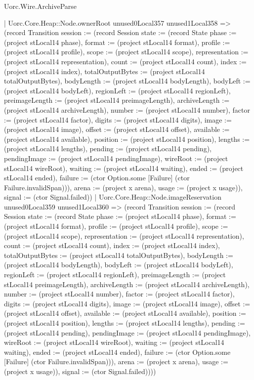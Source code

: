 \begin{lexlean}{Uorc.Wire.ArchiveParse}
\begin{semanticmodule}
{            | Uorc.Core.Heap::Node.ownerRoot unused0Local357 unused1Local358 => (record Transition {session := (record Session {state := (record State {phase := (project stLocal14 phase), format := (project stLocal14 format), profile := (project stLocal14 profile), scope := (project stLocal14 scope), representation := (project stLocal14 representation), count := (project stLocal14 count), index := (project stLocal14 index), totalOutputBytes := (project stLocal14 totalOutputBytes), bodyLength := (project stLocal14 bodyLength), bodyLeft := (project stLocal14 bodyLeft), regionLeft := (project stLocal14 regionLeft), preimageLength := (project stLocal14 preimageLength), archiveLength := (project stLocal14 archiveLength), number := (project stLocal14 number), factor := (project stLocal14 factor), digits := (project stLocal14 digits), image := (project stLocal14 image), offset := (project stLocal14 offset), available := (project stLocal14 available), position := (project stLocal14 position), lengths := (project stLocal14 lengths), pending := (project stLocal14 pending), pendingImage := (project stLocal14 pendingImage), wireRoot := (project stLocal14 wireRoot), waiting := (project stLocal14 waiting), ended := (project stLocal14 ended), failure := (ctor Option.some [Failure] (ctor Failure.invalidSpan))}), arena := (project x arena), usage := (project x usage)}), signal := (ctor Signal.failed)})
            | Uorc.Core.Heap::Node.imageReservation unused0Local359 unused1Local360 => (record Transition {session := (record Session {state := (record State {phase := (project stLocal14 phase), format := (project stLocal14 format), profile := (project stLocal14 profile), scope := (project stLocal14 scope), representation := (project stLocal14 representation), count := (project stLocal14 count), index := (project stLocal14 index), totalOutputBytes := (project stLocal14 totalOutputBytes), bodyLength := (project stLocal14 bodyLength), bodyLeft := (project stLocal14 bodyLeft), regionLeft := (project stLocal14 regionLeft), preimageLength := (project stLocal14 preimageLength), archiveLength := (project stLocal14 archiveLength), number := (project stLocal14 number), factor := (project stLocal14 factor), digits := (project stLocal14 digits), image := (project stLocal14 image), offset := (project stLocal14 offset), available := (project stLocal14 available), position := (project stLocal14 position), lengths := (project stLocal14 lengths), pending := (project stLocal14 pending), pendingImage := (project stLocal14 pendingImage), wireRoot := (project stLocal14 wireRoot), waiting := (project stLocal14 waiting), ended := (project stLocal14 ended), failure := (ctor Option.some [Failure] (ctor Failure.invalidSpan))}), arena := (project x arena), usage := (project x usage)}), signal := (ctor Signal.failed)})))
}
\end{semanticmodule}
\end{lexlean}
